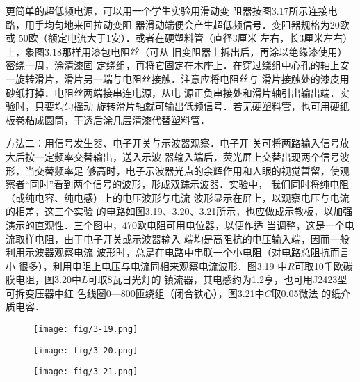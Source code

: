 更简单的超低频电源，可以用一个学生实验用滑动变
阻器按图3.17所示连接电路，用手均匀地来回拉动变阻
器滑动端便会产生超低频信号．变阻器规格为20欧或
50欧（额定电流大于1安）．或者在硬塑料管（直径3厘米
左右，长3厘米左右）上，象图3.18那样用漆包电阻丝（可从
旧变阻器上拆出后，再涂以绝缘漆使用）密绕一周，涂清漆固
定绕组，再将它固定在木座上．在穿过绕组中心孔的轴上安
一旋转滑片，滑片另一端与电阻丝接触．注意应将电阻丝与
滑片接触处的漆皮用砂纸打掉．电阻丝两端接串连电源，从电
源正负串接处和滑片轴引出输出端．实验时，只要均匀摇动
旋转滑片轴就可输出低频信号．若无硬塑料管，也可用硬纸
板卷粘成圆筒，干透后涂几层清漆代替塑料管．

方法二：用信号发生器、电子开关与示波器观察．电子开
关可将两路输入信号放大后按一定频率交替输出，送入示波
器输入端后，荧光屏上交替出现两个信号波形，当交替频率足
够高时，电子示波器光点的余辉作用和人眼的视觉暂留，使观
察者“同时”看到两个信号的波形，形成双踪示波器．实验中，
我们同时将纯电阻（或纯电容、纯电感）上的电压波形与电流
波形显示在屏上，以观察电压与电流的相差，这三个实验
的电路如图3.19、3.20、3.21所示，也应做成示教板，以加强
演示的直观性．三个图中，470欧电阻可用电位器，以便作适
当调整，这是一个电流取样电阻，由于电子开关或示波器输入
端均是高阻抗的电压输入端，因而一般利用示波器观察电流
波形时，总是在电路中串联一个小电阻（对电路总阻抗而言小
很多），利用电阻上电压与电流同相来观察电流波形．图3.19
中$R$可取10千欧碳膜电阻，图3.20中$L$可取8瓦日光灯的
镇流器，其电感约为1.2亨，也可用J2423型可拆变压器中红
色线圈0—800匝绕组（闭合铁心），图3.21中$C$取0.05微法
的纸介质电容．

\begin{figure}[htp]
    \centering
\texttt{[image: fig/3-19.png]}
    \caption{}
\end{figure}

\begin{figure}[htp]\centering
    \begin{minipage}[t]{0.48\textwidth}
    \centering
\texttt{[image: fig/3-20.png]}
    \caption{}
    \end{minipage}
    \begin{minipage}[t]{0.48\textwidth}
    \centering
\texttt{[image: fig/3-21.png]}
    \caption{}
    \end{minipage}
    \end{figure}

